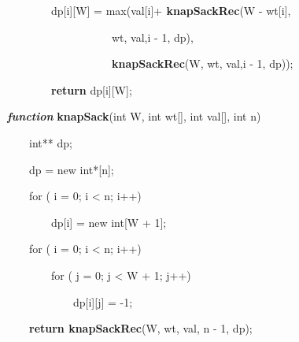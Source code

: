\documentclass[letterpaper]{article}
\begin{document}
\begin{multicols}{2}
\textcolor[rgb]{0.2509804,0.25882354,0.30588236}{\ \ \ \ \ \ \ \ dp[i][W] =
max(val[i]+}\textbf{\textcolor[rgb]{0.2509804,0.25882354,0.30588236}{
knapSackRec}}\textcolor[rgb]{0.2509804,0.25882354,0.30588236}{(W - wt[i],}

{\color[rgb]{0.2509804,0.25882354,0.30588236}
\ \ \ \ \ \ \ \ \ \ \ \ \ \ \ \ \ \ \ wt, val,i - 1, dp),}

\textcolor[rgb]{0.2509804,0.25882354,0.30588236}{\ \ \ \ \ \ \ \ \ \ \ \ \ \ \ \ \ \ \ }\textbf{\textcolor[rgb]{0.2509804,0.25882354,0.30588236}{knapSackRec}}\textcolor[rgb]{0.2509804,0.25882354,0.30588236}{(W,
wt, val,i - 1, dp));}

\textcolor[rgb]{0.2509804,0.25882354,0.30588236}{\ \ \ \ \ \ \ \ }\textbf{\textcolor[rgb]{0.2509804,0.25882354,0.30588236}{return}}\textcolor[rgb]{0.2509804,0.25882354,0.30588236}{
dp[i][W];}


\bigskip

\textbf{\textit{\textcolor[rgb]{0.2509804,0.25882354,0.30588236}{function}}}\textcolor[rgb]{0.2509804,0.25882354,0.30588236}{
}\textbf{\textcolor[rgb]{0.2509804,0.25882354,0.30588236}{knapSack}}\textcolor[rgb]{0.2509804,0.25882354,0.30588236}{(int
W, int wt[], int val[], int n)}

{\color[rgb]{0.2509804,0.25882354,0.30588236}
\ \ \ \ int** dp;}

{\color[rgb]{0.2509804,0.25882354,0.30588236}
\ \ \ \ dp = new int*[n];}

{\color[rgb]{0.2509804,0.25882354,0.30588236}
\ \ \ \ for ( i = 0; i {\textless} n; i++)}

{\color[rgb]{0.2509804,0.25882354,0.30588236}
\ \ \ \ \ \ \ \ dp[i] = new int[W + 1];}


\bigskip

{\color[rgb]{0.2509804,0.25882354,0.30588236}
\ \ \ \ for ( i = 0; i {\textless} n; i++)}

{\color[rgb]{0.2509804,0.25882354,0.30588236}
\ \ \ \ \ \ \ \ for ( j = 0; j {\textless} W + 1; j++)}

{\color[rgb]{0.2509804,0.25882354,0.30588236}
\ \ \ \ \ \ \ \ \ \ \ \ dp[i][j] = -1;}

\textcolor[rgb]{0.2509804,0.25882354,0.30588236}{\ \ \ \ }\textbf{\textcolor[rgb]{0.2509804,0.25882354,0.30588236}{return
knapSackRec}}\textcolor[rgb]{0.2509804,0.25882354,0.30588236}{(W, wt, val, n - 1, dp);}


\bigskip

\bigskip


\bigskip


\end{multicols}
\end{document}
